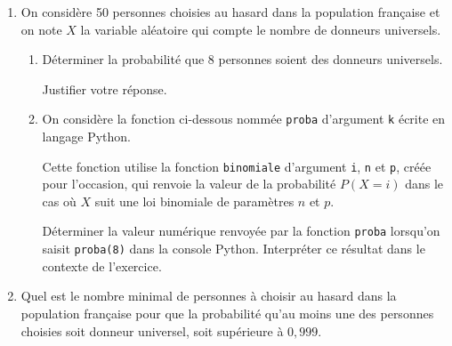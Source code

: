 \begin{enumerate}
	\item On considère 50 personnes choisies au hasard dans la population française et on note $X$ la variable aléatoire qui compte le nombre de donneurs universels.
	\begin{enumerate}
		\item Déterminer la probabilité que 8 personnes soient des donneurs universels.
		
		Justifier votre réponse.
		\item On considère la fonction ci-dessous nommée \texttt{proba} d'argument \texttt{k} écrite en langage \textsf{Python}.
		
		
		Cette fonction utilise la fonction \texttt{binomiale} d'argument \texttt{i}, \texttt{n} et \texttt{p}, créée pour l'occasion, qui renvoie la valeur de la probabilité $P(X=i)$ dans le cas où $X$ suit une loi binomiale de paramètres $n$ et $p$.
		
		Déterminer la valeur numérique renvoyée par la fonction \texttt{proba} lorsqu'on saisit \texttt{proba(8)} dans la console \textsf{Python}. Interpréter ce résultat dans le contexte de l'exercice.

	\end{enumerate}
	\item Quel est le nombre minimal de personnes à choisir au hasard dans la population française pour que la probabilité qu'au moins une des personnes choisies soit donneur universel, soit supérieure à $0,999$.
\end{enumerate}